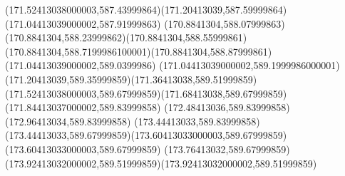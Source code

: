 {{	\curveto(171.52413038000003,587.43999864)(171.20413039,587.59999864)(171.04413039000002,587.91999863)
	\curveto(170.8841304,588.07999863)(170.8841304,588.23999862)(170.8841304,588.55999861)
	\curveto(170.8841304,588.7199986100001)(170.8841304,588.87999861)(171.04413039000002,589.0399986)
	\curveto(171.04413039000002,589.1999986000001)(171.20413039,589.35999859)(171.36413038,589.51999859)
	\curveto(171.52413038000003,589.67999859)(171.68413038,589.67999859)(171.84413037000002,589.83999858)
	\lineto(172.48413036,589.83999858)
	\lineto(172.96413034,589.83999858)
	\lineto(173.44413033,589.83999858)
	\curveto(173.44413033,589.67999859)(173.60413033000003,589.67999859)(173.60413033000003,589.67999859)
	\curveto(173.76413032,589.67999859)(173.92413032000002,589.51999859)(173.92413032000002,589.51999859)
	\closepath
}
}
{
}
